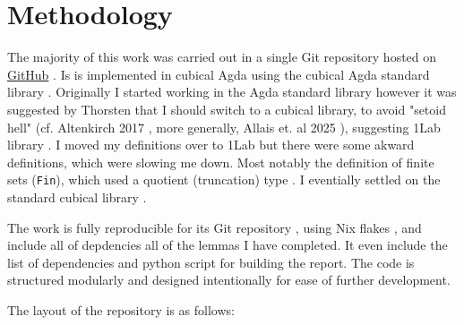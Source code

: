 \section{Methodology}

The majority of this work was carried out in a single Git
\cite{chacon2014-git} repository hosted on 
\href{https://github.com/cdo256/virtualsets}{GitHub}
\cite{odonnell2025-virtual-sets}. Is is implemented in cubical Agda
\cite{vezzosi2021-cubical-agda-dependently} using the cubical Agda
standard library \cite{cubical-agda-lib}. Originally I started working
in the Agda standard library \cite{agda-stdlib} however it was
suggested by Thorsten that I should switch to a cubical library, to
avoid "setoid hell" (cf. Altenkirch 2017
\cite{altenkirch2017-setoid-hell}, more generally, Allais et. al 2025
\cite{allais2025-frex}), suggesting 1Lab library \cite{1lab}. I
moved my definitions over to 1Lab but there were some akward
definitions, which were slowing me down. Most notably the definition
of finite sets (\texttt{Fin}), which used a quotient (truncation) type
\cite{huber2017-cubical-canonicity,doorn2016-hit-truncation}. I eventially
settled on the standard cubical library \cite{cubical-agda-lib}.

The work is fully reproducible for its Git repository
\cite{odonnell2025-virtual-sets}, using Nix flakes \cite{nix-flakes},
and include all of depdencies all of the lemmas I have completed. It
even include the list of dependencies and python script for building
the report. The code is structured modularly and designed
intentionally for ease of further development.

The layout of the repository is as follows:


